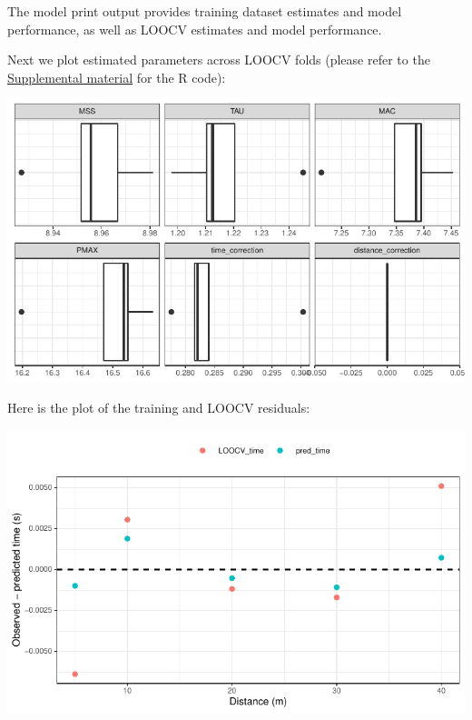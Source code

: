 \documentclass[fleqn,10pt]{wlpeerj} %
\begin{document}
\normalsize

The model print output provides training dataset estimates and model performance, as well as LOOCV estimates and model performance.

Next we plot estimated parameters across LOOCV folds (please refer to the \protect\hyperlink{supplemental-material}{Supplemental material} for the R code):

\small

\begin{center}\includegraphics[width=0.9\linewidth]{paper_files/figure-latex/unnamed-chunk-41-1} \end{center}

\normalsize

Here is the plot of the training and LOOCV residuals:

\small

\begin{center}\includegraphics[width=0.9\linewidth]{paper_files/figure-latex/unnamed-chunk-42-1} \end{center}

\normalsize
\end{document}
